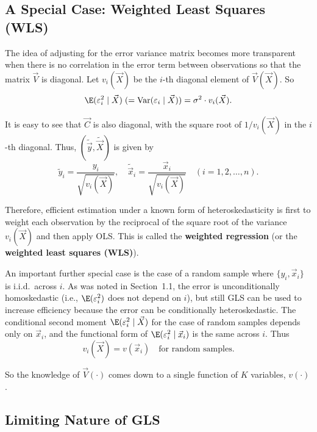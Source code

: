 \subsection*{A Special Case: Weighted Least Squares (WLS)}

The idea of adjusting for the error variance matrix becomes more transparent when
there is no correlation in the error term between observations so that the matrix
$\vec{V}$ is diagonal.  Let $v_i(\vec{X})$ be the $i$-th diagonal element of
$\vec{V}(\vec{X})$.  So
%
\[
  \E(\varepsilon_i^2 \mid \vec{X})
    \;(= \Var(\varepsilon_i \mid \vec{X}))
    = \sigma^2 \cdot v_i(\vec{X}).
\]

It is easy to see that $\vec{C}$ is also diagonal, with the square root of
$1/v_i(\vec{X})$ in the $i$-th diagonal.  Thus,
$(\tilde{\vec{y}}, \widetilde{\vec{X}})$ is given by
%
\[
  \tilde{y}_i = \frac{y_i}{\sqrt{v_i(\vec{X})}}, \quad
  \tilde{\vec{x}}_i = \frac{\vec{x}_i}{\sqrt{v_i(\vec{X})}}
  \quad (i = 1, 2, \ldots, n).
\]

Therefore, efficient estimation under a known form of heteroskedasticity is first to
weight each observation by the reciprocal of the square root of the variance
$v_i(\vec{X})$ and then apply OLS\@.  This is called the \textbf{weighted regression}
(or the \textbf{weighted least squares (WLS)}).

An important further special case is the case of a random sample where
$\{y_i, \vec{x}_i\}$ is i.i.d.\ across $i$.  As was noted in Section~1.1, the error
is unconditionally homoskedastic (i.e., $\E(\varepsilon_i^2)$ does not depend on $i$),
but still GLS can be used to increase efficiency because the error can be conditionally
heteroskedastic.  The conditional second moment
$\E(\varepsilon_i^2 \mid \vec{X})$ for the case of random samples depends only on
$\vec{x}_i$, and the functional form of $\E(\varepsilon_i^2 \mid \vec{x}_i)$ is the
same across $i$.  Thus
%
\begin{equation}
  v_i(\vec{X}) = v(\vec{x}_i) \quad \text{for random samples.}
  \label{eq:1.6.7}
\end{equation}

So the knowledge of $\vec{V}(\cdot)$ comes down to a single function of $K$ variables,
$v(\cdot)$.

\subsection*{Limiting Nature of GLS}

